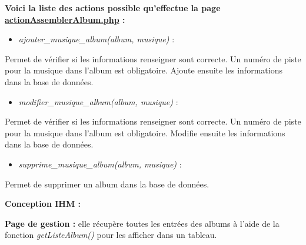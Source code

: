 			\begin{paragraphe}
                \textbf{Voici la liste des actions possible qu'effectue la page \underline{actionAssemblerAlbum.php} :}
            
                \begin{itemize}
                    \item \emph{ajouter\_musique\_album(album, musique)} :
                \end{itemize}
                \begin{paragraphe}
                    Permet de vérifier si les informations renseigner sont correcte. Un numéro de piste pour la musique dans l'album est obligatoire. Ajoute ensuite les informations dans la base de données.
                \end{paragraphe}
                
                \begin{itemize}
                    \item \emph{modifier\_musique\_album(album, musique)} :
                \end{itemize}
                \begin{paragraphe}
                    Permet de vérifier si les informations renseigner sont correcte. Un numéro de piste pour la musique dans l'album est obligatoire. Modifie ensuite les informations dans la base de données.
                \end{paragraphe}
                
                \begin{itemize}
                    \item \emph{supprime\_musique\_album(album, musique)} :
                \end{itemize}
                \begin{paragraphe}
                    Permet de supprimer un album dans la base de données.
                \end{paragraphe}
            \end{paragraphe}

			\begin{paragraphe}
				\textbf{Conception IHM :}
			\end{paragraphe}
            
            \begin{paragraphe}
                \textbf{Page de gestion :} elle récupère toutes les entrées des albums à l'aide de la fonction \emph{getListeAlbum()} pour les afficher dans un tableau.
            \end{paragraphe}

